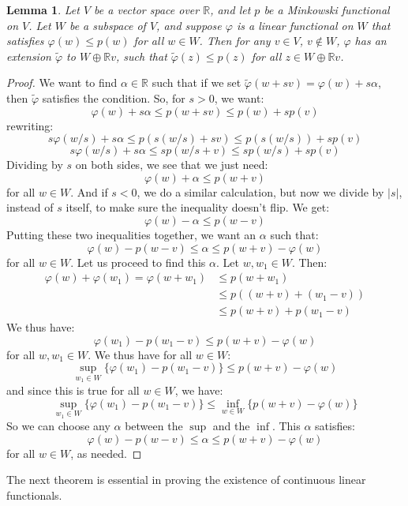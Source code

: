 \documentclass[a4paper,12pt]{report}
\newcommand{\vphi} {\varphi}
\newtheorem{lemma}[theorem]{Lemma}
\begin{document}
	\begin{lemma}
	Let $V$ be a vector space over $\mathbb{R}$, and let $p$ be a Minkowski functional on $V$. Let $W$ be a subspace of $V$, and suppose $\varphi$ is a linear functional on $W$ that satisfies $\varphi(w) \leq p(w)$ for all $w \in W$. Then for any $v \in V$, $v \notin W$, $\varphi$ has an extension $\tilde{\varphi}$ to $W \oplus \mathbb{R}v$, such that $\tilde{\varphi}(z) \leq p(z)$ for all $z \in W \oplus \mathbb{R}v$. 
	\end{lemma}
	\begin{proof}
	We want to find $\alpha \in \mathbb{R}$ such that if we set $\tilde{\vphi}(w + sv) = \vphi(w) + s\alpha$, then $\tilde{\vphi}$ satisfies the condition. So, for $s > 0$, we want:
	\[ \varphi(w) + s\alpha \leq p(w + sv) \leq p(w) + sp(v) \]
	rewriting:
	\[ s \vphi(w/s) + s\alpha \leq p(s (w/s) + sv) \leq p(s(w/s)) + sp(v) \]
	\[ s \vphi(w/s) + s\alpha \leq sp(w/s + v) \leq sp(w/s) + sp(v) \]
	Dividing by $s$ on both sides, we see that we just need:
	\[ \vphi(w) + \alpha \leq p(w + v) \]
	for all $w \in W$. And if $s < 0$, we do a similar calculation, but now we divide by $|s|$, instead of $s$ itself, to make sure the inequality doesn't flip. We get:
	\[ \vphi(w) - \alpha \leq p(w - v) \]
	Putting these two inequalities together, we want an $\alpha$ such that:
	\[ \vphi(w) - p(w - v) \leq \alpha \leq p(w + v) - \vphi(w) \]
	for all $w \in W$. Let us proceed to find this $\alpha$. Let $w, w_1 \in W$. Then:
	\begin{align*}
	\vphi(w) + \vphi(w_1) = \vphi(w + w_1) &\leq p(w + w_1) \\
	&\leq p((w + v) + (w_1 - v)) \\
	&\leq p(w + v) + p(w_1 - v) 
	\end{align*}
	We thus have:
	\[ \vphi(w_1) - p(w_1 - v) \leq p(w + v) - \vphi(w) \]
	for all $w, w_1 \in W$. We thus have for all $w \in W$:
	\[ \sup_{w_1 \in W} \big\{ \vphi(w_1) - p(w_1 - v) \big\} \leq p(w+v) - \vphi(w) \]
	and since this is true for all $w \in W$, we have:
	\[ \sup_{w_1 \in W} \big\{ \vphi(w_1) - p(w_1 - v) \big\} \leq \inf_{w \in W} \big\{ p(w+v) - \vphi(w) \big\} \]
	So we can choose any $\alpha$ between the $\sup$ and the $\inf$. This $\alpha$ satisfies:
	\[ \vphi(w) - p(w - v) \leq \alpha \leq p(w + v) - \vphi(w) \]
	for all $w \in W$, as needed. 
	\end{proof}
	
	\noindent The next theorem is essential in proving the existence of continuous linear functionals.
	
\end{document}
